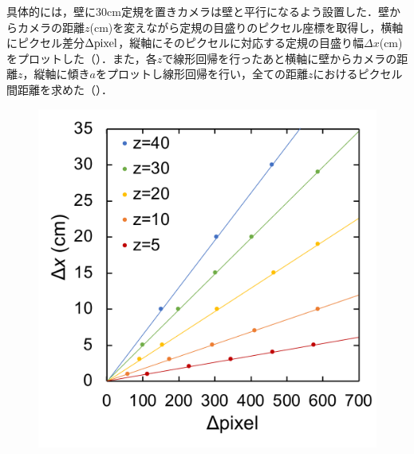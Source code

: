 具体的には，壁に30cm定規を置きカメラは壁と平行になるよう設置した．壁からカメラの距離$z$(cm)を変えながら定規の目盛りのピクセル座標を取得し，横軸にピクセル差分$\Delta \rm{pixel}$，縦軸にそのピクセルに対応する定規の目盛り幅$\Delta x$(cm)をプロットした（）．また，各$z$で線形回帰を行ったあと横軸に壁からカメラの距離$z$，縦軸に傾き$a$をプロットし線形回帰を行い，全ての距離$z$におけるピクセル間距離を求めた（）．

\begin{figure}
    \centering
    \begin{minipage}{0.49\hsize}
        \centering
        \includegraphics[width=\linewidth]{figure/chapter4/pixel2distance}
        \label{fig:pix2dist}
    \end{minipage}
    \begin{minipage}{0.49\hsize}
        \centering

\end{minipage}
\end{figure}
